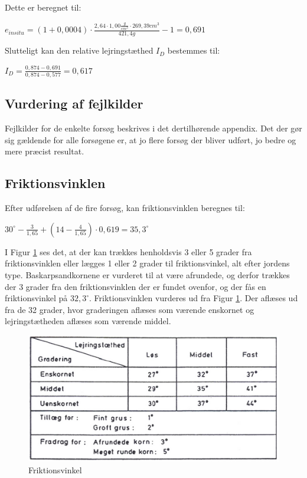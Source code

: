 Dette er beregnet til:

\begin{center}
	$e_{in situ} = (1+0,\!0004) \cdot \frac{2,\!64 \cdot 1,\!00 \frac{g}{cm^3} \cdot 269,\!39 cm^3}{421,\!4 g} - 1 = 0,\!691$
\end{center}

Slutteligt kan den relative lejringstæthed $I_D$ bestemmes til:

\begin{center}
	$I_D = \frac{0,\!874 - 0,\!691}{0,\!874 - 0,\!577} = 0,\!617$
\end{center}

\subsection{Vurdering af fejlkilder}
Fejlkilder for de enkelte forsøg beskrives i det dertilhørende appendix. Det der gør sig gældende for alle forsøgene er, at jo flere forsøg der bliver udført, jo bedre og mere præcist resultat. 

\subsection{Friktionsvinklen}
Efter udførelsen af de fire forsøg, kan friktionsvinklen beregnes til:

\begin{center}
	$30^\circ - \frac{3}{1,\!65} + (14 - \frac{4}{1,\!65}) \cdot 0,\!619 = 35,\!3^\circ$
\end{center}

I Figur \ref{fig:friktionsvinkel} ses det, at der kan trækkes henholdsvis 3 eller 5 grader fra friktionsvinklen eller lægges 1 eller 2 grader til friktionsvinkel, alt efter jordens type. Baskarpsandkornene er vurderet til at være afrundede, og derfor trækkes der 3 grader fra den friktionsvinklen der er fundet ovenfor, og der fås en friktionsvinkel på $32,\!3^\circ$. 
\newline
\newline
Friktionsvinklen vurderes ud fra Figur \ref{fig:friktionsvinkel}. Der aflæses ud fra de 32 grader, hvor graderingen aflæses som værende enskornet og lejringstætheden aflæses som værende middel.

\begin{figure}[htbp] \centering
	\begin{minipage}[b]{0.48\textwidth}\centering
		\includegraphics[width=1.2\textwidth]{billeder/friktionsvinkel.png}
		\caption{Friktionsvinkel \citep[ s. 170]{geoteknik}}
		\label{fig:friktionsvinkel}
	\end{minipage}\hfill
\end{figure}

